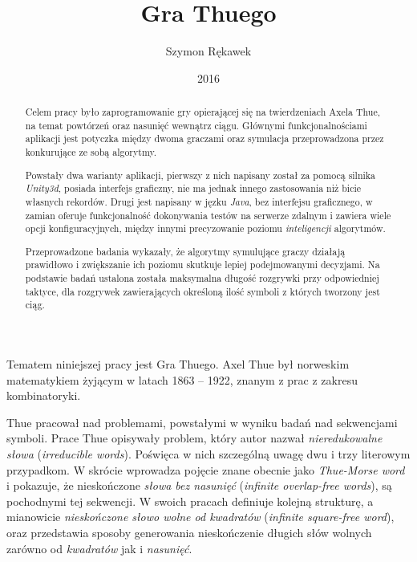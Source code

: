 \documentclass[document]{xmgr}
\author   {Szymon Rękawek}
\title    {Gra Thuego}
\date     {2016}
\begin{document}
\begin{abstract}
Celem pracy było zaprogramowanie gry opierającej się na twierdzeniach Axela Thue, na temat powtórzeń oraz nasunięć wewnątrz ciągu. Głównymi funkcjonalnościami aplikacji jest potyczka między dwoma graczami oraz symulacja przeprowadzona przez konkurujące ze sobą algorytmy. 

Powstały dwa warianty aplikacji, pierwszy z nich napisany został za pomocą silnika \emph{Unity3d}, posiada interfejs graficzny, nie ma jednak innego zastosowania niż bicie własnych rekordów. Drugi jest napisany w jęzku \emph{Java}, bez interfejsu graficznego, w zamian oferuje funkcjonalność dokonywania testów na serwerze zdalnym i zawiera wiele opcji konfiguracyjnych, między innymi precyzowanie poziomu \emph{inteligencji} algorytmów. 

Przeprowadzone badania wykazały, że algorytmy symulujące graczy działają prawidłowo i zwiększanie ich poziomu skutkuje lepiej podejmowanymi decyzjami. Na podstawie badań ustalona została maksymalna długość rozgrywki przy odpowiedniej taktyce, dla rozgrywek zawierających określoną ilość symboli z których tworzony jest ciąg.
\end{abstract}


\maketitle

\introduction

Tematem niniejszej pracy jest Gra Thuego. Axel Thue był norweskim matematykiem żyjącym w latach 1863 -- 1922, znanym z prac z zakresu kombinatoryki.

Thue pracował nad problemami, powstałymi w wyniku badań nad sekwencjami symboli. Prace Thue \cite{repetition} opisywały problem, który autor nazwał \emph{nieredukowalne słowa} (\emph{irreducible words}). Poświęca w nich szczególną uwagę dwu i trzy literowym przypadkom. W skrócie wprowadza pojęcie znane obecnie jako \emph{Thue-Morse word} i pokazuje, że nieskończone \emph{słowa bez nasunięć} (\emph{infinite overlap-free words}), są pochodnymi tej sekwencji. W swoich pracach definiuje kolejną strukturę, a mianowicie \emph{nieskończone słowo wolne od kwadratów}  (\emph{infinite square-free word}), oraz przedstawia sposoby generowania nieskończenie długich słów wolnych zarówno od \emph{kwadratów} jak i \emph{nasunięć}.
\end{document}
